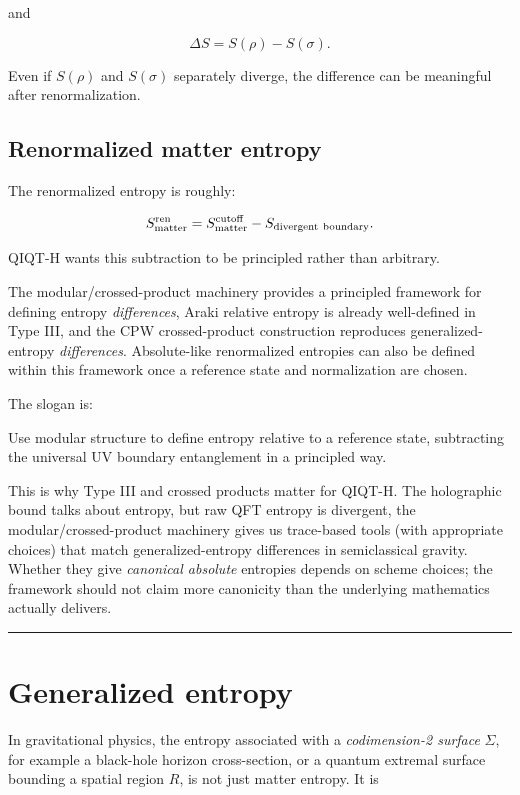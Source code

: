 \documentclass[11pt,a4paper]{article}
\newenvironment{qiqtquote}{\begin{mdframed}[style=quotestyle]}{\end{mdframed}}
\begin{document}
and

\[
\Delta S=S(\rho)-S(\sigma).
\]

Even if $S(\rho)$ and $S(\sigma)$ separately diverge, the difference can be meaningful after renormalization.

\subsection{Renormalized matter entropy}

The renormalized entropy is roughly:

\[
S_{\rm matter}^{\rm ren}
=
S_{\rm matter}^{\rm cutoff}
-
S_{\rm divergent\ boundary}.
\]

QIQT-H wants this subtraction to be principled rather than arbitrary.

The modular/crossed-product machinery provides a principled framework for defining entropy \emph{differences}, Araki relative entropy is already well-defined in Type III, and the CPW crossed-product construction reproduces generalized-entropy \emph{differences}. Absolute-like renormalized entropies can also be defined within this framework once a reference state and normalization are chosen.

The slogan is:

\begin{qiqtquote}
Use modular structure to define entropy relative to a reference state, subtracting the universal UV boundary entanglement in a principled way.
\end{qiqtquote}

This is why Type III and crossed products matter for QIQT-H. The holographic bound talks about entropy, but raw QFT entropy is divergent, the modular/crossed-product machinery gives us trace-based tools (with appropriate choices) that match generalized-entropy differences in semiclassical gravity. Whether they give \emph{canonical absolute} entropies depends on scheme choices; the framework should not claim more canonicity than the underlying mathematics actually delivers.

\medskip\hrule\medskip

\section{Generalized entropy}

In gravitational physics, the entropy associated with a \emph{codimension-2 surface} $\Sigma$, for example a black-hole horizon cross-section, or a quantum extremal surface bounding a spatial region $R$, is not just matter entropy. It is
\end{document}

